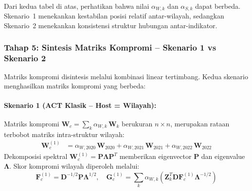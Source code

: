 Dari kedua tabel di atas, perhatikan bahwa nilai $\alpha_{W,k}$ dan $\alpha_{S,k}$ dapat berbeda. Skenario~1 menekankan kestabilan posisi relatif antar-wilayah, sedangkan Skenario~2 menekankan konsistensi struktur hubungan antar-indikator.

\subsubsection{Tahap 5: Sintesis Matriks Kompromi -- Skenario 1 vs Skenario 2}
Matriks kompromi disintesis melalui kombinasi linear tertimbang. Kedua skenario menghasilkan matriks kompromi yang berbeda:

\paragraph{Skenario 1 (ACT Klasik -- Host = Wilayah):}
Matriks kompromi $\mathbf{W}_c = \sum_k \alpha_{W,k}\,\mathbf{W}_k$ berukuran $n \times n$, merupakan rataan terbobot matriks intra-struktur wilayah:
\begin{align*}
    \mathbf{W}_c^{(1)} &= \alpha_{W,2020}\,\mathbf{W}_{2020} + \alpha_{W,2021}\,\mathbf{W}_{2021} + \alpha_{W,2022}\,\mathbf{W}_{2022}
\end{align*}
Dekomposisi spektral $\mathbf{W}_c^{(1)} = \mathbf{P}\mathbf{\Lambda}\mathbf{P}^T$ memberikan eigenvector $\mathbf{P}$ dan eigenvalue $\mathbf{\Lambda}$. Skor kompromi wilayah diperoleh melalui:
\begin{equation}
    \mathbf{F}_c^{(1)} = \mathbf{D}^{-1/2}\mathbf{P}\mathbf{\Lambda}^{1/2}, \quad
    \mathbf{G}_c^{(1)} = \sum_k \alpha_{W,k}\left(\mathbf{Z}_k^T\mathbf{D}\mathbf{F}_c^{(1)}\mathbf{\Lambda}^{-1/2}\right)
\end{equation}

